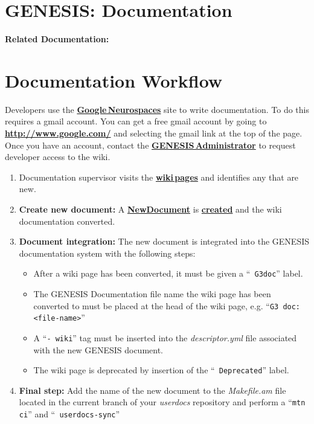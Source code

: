 \documentclass[12pt]{article}
\begin{document}
\section*{GENESIS: Documentation}

{\bf Related Documentation:}

\section*{Documentation Workflow}

Developers use the
\href{http://code.google.com/p/neurospaces/wiki/Index}{\bf
  Google\,Neurospaces} site to write documentation. To do this
requires a gmail account. You can get a free gmail account by going to
\href{http://www.google.com/}{\bf http://www.google.com/} and
selecting the gmail link at the top of the page. Once you have an
account, contact the \href{http://www.genesis-sim.org/contact}{\bf
  GENESIS\,Administrator} to request developer access to the wiki.
\begin{enumerate}
\item Documentation supervisor visits the
  \href{http://code.google.com/p/neurospaces/w/list}{\bf wiki\,pages}
  and identifies any that are new.
\item{\bf Create new document:} A
  \href{../NewDocument/NewDocument.tex}{\bf NewDocument} is
  \href{../document-create/document-create.tex}{\bf created} and the
  wiki documentation converted.
\item{\bf Document integration:} The new document is integrated into
  the GENESIS documentation system with the following steps:
\begin{itemize}
\item After a wiki page has been converted, it must be given a ``{\tt
    G3doc}'' label.
\item The GENESIS Documentation file name the wiki page has been
  converted to must be placed at the head of the wiki page, e.g.
  ``{\tt G3 doc: <file-name>}''
\item A ``{\tt -\,wiki}'' tag must be inserted into the {\it
    descriptor.yml} file associated with the new GENESIS document.
\item The wiki page is deprecated by insertion of the ``{\tt
    Deprecated}'' label.
\end{itemize}
\item {\bf Final step:} Add the name of the new document to the {\it
    Makefile.am} file located in the current branch of your {\it
    userdocs} repository and perform a ``{\tt mtn ci}'' and ``{\tt
    userdocs-sync}''
\end{enumerate}
\end{document}
